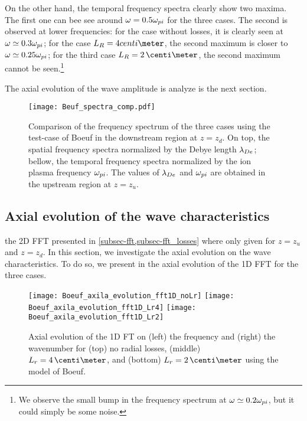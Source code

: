 On the other hand, the temporal frequency spectra clearly show two maxima. 
The first one can bee see around $\omega = 0.5 \omega_{pi}$ for the three cases.
The second is observed at lower frequencies\string: for the case without losses, it is clearly seen at  $\omega \simeq 0.3 \omega_{pi}$; for the case $L_R=4\\centi\meter$, the second maximum is closer to $\omega \simeq 0.25 \omega_{pi}$; for the third case $L_R=2\,\centi\meter$, the second maximum cannot be seen.\footnote{We observe the small bump in the frequency spectrum at $\omega \simeq 0.2 \omega_{pi}$, but it could simply be some noise. }

The axial evolution of the wave amplitude is analyze is the next section. 


\begin{figure}[hbtp]
  \centering
  \texttt{[image: Beuf\_spectra\_comp.pdf]}
  \caption{Comparison of the frequency spectrum of the three cases using the test-case of Boeuf in the downstream region at $z=z_d$. On top, the spatial frequency spectra normalized by the Debye length $\lambda_{De}$; bellow, the temporal frequency spectra normalized by the ion plasma frequency $\omega_{pi}$. The values of $\lambda_{De}$ and $\omega_{pi}$ are obtained in the upstream region at $z=z_u$.}
  \label{fig-boeuf_fft_comparasion}
\end{figure}

\FloatBarrier
\subsection{Axial evolution of the wave characteristics} \label{subsec-axial_profile}

the \ac{2D} \ac{FFT} presented in \cref{subsec-fft,subsec-fft_losses} where only given for $z=z_u$ and $z=z_d$.
In this section, we investigate the axial evolution on the wave characteristics.
To do so, we present in  the axial evolution of the \ac{1D} \ac{FFT} for the three cases.
 
\begin{figure}[hbt]
  \centering
  \texttt{[image: Boeuf\_axila\_evolution\_fft1D\_noLr]}
  \texttt{[image: Boeuf\_axila\_evolution\_fft1D\_Lr4]}
  \texttt{[image: Boeuf\_axila\_evolution\_fft1D\_Lr2]}
  \caption{Axial evolution of the \ac{1D} \ac{FT} on (left) the frequency and (right) the wavenumber for (top) no radial losses, (middle) $L_r=4\,\centi\meter$, and (bottom) $L_r=2\,\centi\meter$ using the model of Boeuf. }
  \label{fig-axial_fft1D}
\end{figure}

